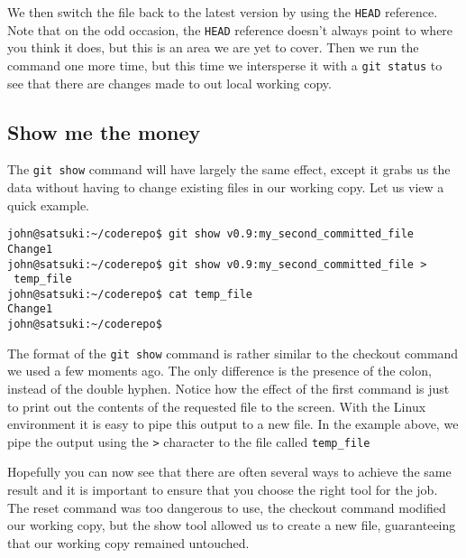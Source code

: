 We then switch the file back to the latest version by using the \texttt{HEAD} reference.  Note that on the odd occasion, the \texttt{HEAD} reference doesn't always point to where you think it does, but this is an area we are yet to cover.  Then we run the command one more time, but this time we intersperse it with a \texttt{git status} to see that there are changes made to out local working copy.

\subsection{Show me the money}
The \texttt{git show} command will have largely the same effect, except it grabs us the data without having to change existing files in our working copy.  Let us view a quick example.

\begin{Verbatim}
john@satsuki:~/coderepo$ git show v0.9:my_second_committed_file
Change1
john@satsuki:~/coderepo$ git show v0.9:my_second_committed_file > 
 temp_file
john@satsuki:~/coderepo$ cat temp_file 
Change1
john@satsuki:~/coderepo$ 
\end{Verbatim}

The format of the \texttt{git show} command is rather similar to the checkout command we used a few moments ago.  The only difference is the presence of the colon, instead of the double hyphen.  Notice how the effect of the first command is just to print out the contents of the requested file to the screen.  With the Linux environment it is easy to pipe this output to a new file.  In the example above, we pipe the output using the \texttt{>} character to the file called \texttt{temp\_file}

Hopefully you can now see that there are often several ways to achieve the same result and it is important to ensure that you choose the right tool for the job.  The reset command was too dangerous to use, the checkout command modified our working copy, but the show tool allowed us to create a new file, guaranteeing that our working copy remained untouched.

